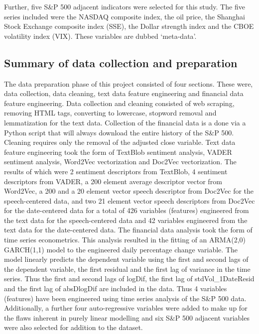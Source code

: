 \documentclass[11pt,preprint, authoryear]{elsarticle}
\numberwithin{equation}{section}
\numberwithin{figure}{section}
\numberwithin{table}{section}
\begin{document}
Further, five S\&P 500 adjacent indicators were selected for this study.
The five series included were the NASDAQ composite index, the oil price,
the Shanghai Stock Exchange composite index (SSE), the Dollar strength
index and the CBOE volatility index (VIX). These variables are dubbed
`meta-data'.

\hypertarget{summary-of-data-collection-and-preparation}{%
\subsection{Summary of data collection and
preparation}\label{summary-of-data-collection-and-preparation}}

The data preparation phase of this project consisted of four sections.
These were, data collection, data cleaning, text data feature
engineering and financial data feature engineering. Data collection and
cleaning consisted of web scraping, removing HTML tags, converting to
lowercase, stopword removal and lemmatization for the text data.
Collection of the financial data is a done via a Python script that will
always download the entire history of the S\&P 500. Cleaning requires
only the removal of the adjusted close variable. Text data feature
engineering took the form of TextBlob sentiment analysis, VADER
sentiment analysis, Word2Vec vectorization and Doc2Vec vectorization.
The results of which were 2 sentiment descriptors from TextBlob, 4
sentiment descriptors from VADER, a 200 element average descriptor
vector from Word2Vec, a 200 and a 20 element vector speech descriptor
from Doc2Vec for the speech-centered data, and two 21 element vector
speech descriptors from Doc2Vec for the date-centered data for a total
of 426 variables (features) engineered from the text data for the
speech-centered data and 42 variables engineered from the text data for
the date-centered data. The financial data analysis took the form of
time series econometrics. This analysis resulted in the fitting of an
ARMA(2,0) GARCH(1,1) model to the engineered daily percentage change
variable. The model linearly predicts the dependent variable using the
first and second lags of the dependent variable, the first residual and
the first lag of variance in the time series. Thus the first and second
lags of logDif, the first lag of stdVol\_1DateResid and the first lag of
absDlogDif are included in the data. Thus 4 variables (features) have
been engineered using time series analysis of the S\&P 500 data.
Additionally, a further four auto-regressive variables were added to
make up for the flaws inherent in purely linear modelling and six S\&P
500 adjacent variables were also selected for addition to the dataset.
\end{document}
